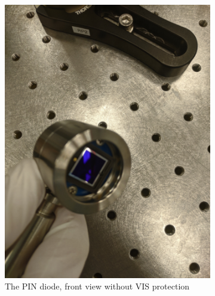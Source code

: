 \documentclass[a4paper, 10pt]{article}
\begin{document}
\begin{figure}[h]
    \centering
    \begin{subfigure}{0.4\textwidth}
        \includegraphics[width=\textwidth]{../images/pin-front.jpg}
        \caption{The PIN diode, front view without VIS protection}
        \label{fig:pin-diode}
    \end{subfigure}
    \begin{subfigure}{0.4\textwidth}

\end{subfigure}
\end{figure}
\end{document}
